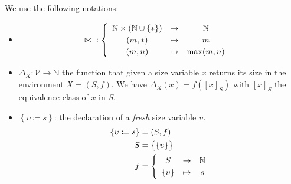\documentclass{article}
\begin{document}
We use the following notations:
\begin{itemize}
  \item \begin{align*} {}\bowtie{} & : \left\{ \def\arraystretch{1.2}
               \begin{array}{ccc}
                         \mathbb{N} \times \left(\mathbb{N} \cup \left\{\ast\right\}\right) & \to     & \mathbb{N} \\
                         (m, \ast)                                                          & \mapsto & m          \\
                         (m, n)                                                             & \mapsto & \max(m, n)
                       \end{array}
               \right.
        \end{align*}
  \item $\Delta_X : \mathcal{V} \to \mathbb{N}$ the function that given
        a size variable $x$ returns its size in the environment $X=(S,
          f)$. We have $\Delta_X(x) = f\left({[x]}_S\right)$ with ${[x]}_S$
        the equivalence class of $x$ in $S$.

  \item $\left\{\upsilon \coloneq s\right\}$: the declaration of a
        \emph{fresh} size variable $\upsilon$.
        \begin{align*}
          \left\{\upsilon \coloneq s\right\}
            & = (S, f)                     \\
          S & = \bigl\{\{\upsilon\}\bigr\} \\
          f & = \left\{
          \def\arraystretch{1.2}
          \begin{array}{ccc}
            S            & \to     & \mathbb{N} \\
            \{\upsilon\} & \mapsto & s
          \end{array}
          \right.
        \end{align*}


\end{itemize}
\end{document}

